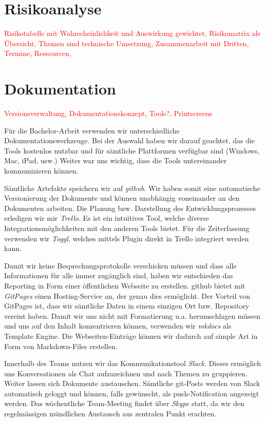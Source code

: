 \documentclass[a4paper,ngerman, 11pt]{report}
\newcommand\Diskussionspunkt[1]{\textcolor{red}{#1}}
\begin{document}
\section{Risikoanalyse}
   
\Diskussionspunkt{Risikotabelle mit Wahrscheinlichkeit und Auswirkung gewichtet, Risikomatrix als Übersicht, Themen sind technische Umsetzung, Zusammenarbeit mit Dritten, Termine, Ressourcen, }



\section{Dokumentation}
\Diskussionspunkt{Versionsverwaltung, Dokumentationskonzept, Tools?, Printscreens}

Für die Bachelor-Arbeit verwenden wir unterschiedliche Dokumentationswerkzeuge. Bei der Auswahl haben wir darauf geachtet, das die Tools kostenlos nutzbar und für sämtliche Plattformen verfügbar sind (Windows, Mac, iPad, usw.) Weiter war uns wichtig, dass die Tools untereinander kommunizieren können. 

Sämtliche Artefakte speichern wir auf \textit{github}. Wir haben somit eine automatische Versionierung der Dokumente und können unabhängig voneinander an den Dokumenten arbeiten. Die Planung bzw. Darstellung des Entwicklungsprozesses erledigen wir mir \textit{Trello}. Es ist ein intuitives Tool, welche diverse Integrationsmöglichkeiten mit den anderen Tools bietet. Für die Zeiterfassung verwenden wir \textit{Toggl}, welches mittels Plugin direkt in Trello integriert werden kann.

Damit wir keine Besprechungsprotokolle verschicken müssen und dass alle Informationen für alle immer zugänglich sind, haben wir entschieden das Reporting in Form einer öffentlichen Webseite zu erstellen. github bietet mit \textit{GitPages} einen Hosting-Service an, der genau dies ermöglicht. Der Vorteil von GitPages ist, dass wir sämtliche Daten in einem einzigen Ort bzw. Repository vereint haben. Damit wir uns nicht mit Formatierung u.a. herumschlagen müssen und uns auf den Inhalt konzentrieren können, verwenden wir \textit{mkdocs} als Template Engine. Die Webseiten-Einträge können wir dadurch auf simple Art in Form von Markdown-Files erstellen.

Innerhalb des Teams nutzen wir das Kommunikationstool \textit{Slack}. Dieses ermöglich uns Konversationen als Chat aufzuzeichnen und nach Themen zu gruppieren. Weiter lassen sich Dokumente austauschen. Sämtliche git-Posts werden von Slack automatisch geloggt und können, falls gewünscht, als push-Notification angezeigt werden.
Das wöchentliche Team-Meeting findet über \textit{Skype} statt, da wir den regelmässigen mündlichen Austausch aus zentralen Punkt erachten.
\end{document}
